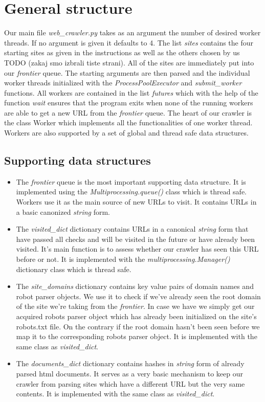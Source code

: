\documentclass[runningheads]{llncs}
\begin{document}
\section{General structure}
Our main file \textit{web\_crawler.py} takes as an argument the number of desired worker threads. If no argument is given it defaults to 4. The list \textit{sites} contains the four starting sites as given in the instructions as well as the others chosen by us TODO (zakaj smo izbrali tiste strani). All of the sites are immediately put into our \textit{frontier} queue. The starting arguments are then parsed and the individual worker threads initialized with the \textit{ProcessPoolExecutor} and \textit{submit\_worker} functions. All workers are contained in the list \textit{futures} which with the help of the function \textit{wait} ensures that the program exits when none of the running workers are able to get a new URL from the \textit{frontier} queue.
The heart of our crawler is the class Worker which implements all the functionalities of one worker thread. Workers are also supported by a set of global and thread safe data structures. 

\subsection{Supporting data structures}
\begin{itemize}
  \item The \textit{frontier} queue is the most important supporting data structure. It is implemented using the \textit{Multiprocessing.queue()} class which is thread safe. Workers use it as the main source of new URLs to visit. It contains URLs in a basic canonized \textit{string} form.
  \item The \textit{visited\_dict} dictionary contains URLs in a canonical \textit{string} form that have passed all checks and will be visited in the future or have already been visited. It's main function is to assess whether our crawler has seen this URL before or not. It is implemented with the \textit{multiprocessing.Manager()} dictionary class which is thread safe.
  \item The \textit{site\_domains} dictionary contains key value pairs of domain names and robot parser objects. We use it to check if we've already seen the root domain of the site we're taking from the \textit{frontier}. In case we have we simply get our acquired robots parser object which has already been initialized on the site's robots.txt file. On the contrary if the root domain hasn't been seen before we map it to the corresponding robots parser object. It is implemented with the same class as \textit{visited\_dict}.
  \item The \textit{documents\_dict} dictionary contains hashes in \textit{string} form of already parsed html documents. It serves as a very basic mechanism to keep our crawler from parsing sites which have a different URL but the very same contents. It is implemented with the same class as \textit{visited\_dict}.
\end{itemize}
\end{document}
